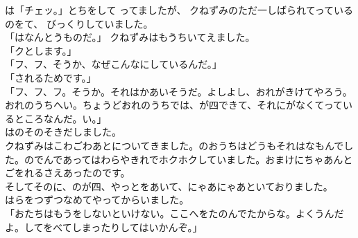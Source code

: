 \documentclass[
a4paper,
10pt,
book]
{tarticle}
\begin{document}
\noindent {}は「チェッ。」とちをして
ってましたが、
クねずみのただ一しばられてっているのをて、
びっくりしていました。\\
「はなんとうものだ。」
クねずみはもうちいてえました。\\
「クとします。」\\
「フ、フ、そうか、なぜこんなにしているんだ。」\\
「されるためです。」\\
「フ、フ、フ。そうか。それはかあいそうだ。よしよし、おれがきけてやろう。
おれのうちへい。ちょうどおれのうちでは、が四できて、それにがなくてっているところなんだ。い。」\\
\indent {}はのそのそきだしました。\\
\indent クねずみはこわごわあとについてきました。のおうちはどうもそれはなもんでした。のでんであってはわらやきれでホクホクしていました。おまけにちゃあんとごをれるさえあったのです。\\
\indent そしてそのに、のが四、やっとをあいて、にゃあにゃあといておりました。\\
\indent {}はらをつずつなめてやってからいました。\\
「おたちはもうをしないといけない。ここへをたのんでたからな。よくうんだよ。してをべてしまったりしてはいかんぞ。」

\newpage
\thispagestyle{fancy}
\fancyhead[R]{\empty}
\end{document}
